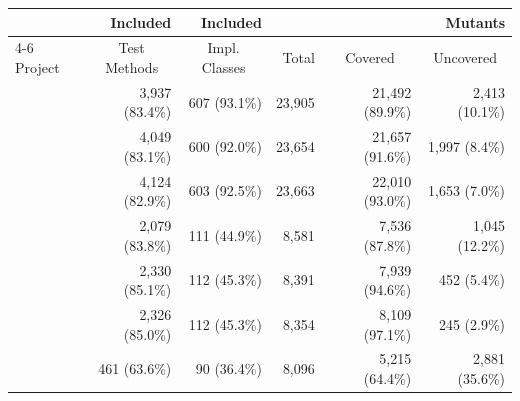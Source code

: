   \begin{tabular}{lrrrrr}
  \toprule
   & Included & Included  & \multicolumn{3}{r}{Mutants} \\
  \cmidrule(lr){4-6}
  Project & \multicolumn{1}{c}{Test Methods} & \multicolumn{1}{c}{Impl. Classes} & Total & \multicolumn{1}{c}{Covered} & \multicolumn{1}{c}{Uncovered} \\
  \midrule
  \DatasetEqBenchA{} & 3,937\; (83.4\%) & 607\; (93.1\%) & 23,905 & 21,492\; (89.9\%) & 2,413\; (10.1\%) \\
  \DatasetEqBenchB{} & 4,049\; (83.1\%) & 600\; (92.0\%) & 23,654 & 21,657\; (91.6\%) & 1,997\; (\phantom{0}8.4\%) \\
  \DatasetEqBenchC{} & 4,124\; (82.9\%) & 603\; (92.5\%) & 23,663 & 22,010\; (93.0\%) & 1,653\; (\phantom{0}7.0\%) \\
  \midrule
  \DatasetCommonsA{} & 2,079\; (83.8\%) & 111\; (44.9\%) & 8,581 & 7,536\; (87.8\%) & 1,045\; (12.2\%) \\
  \DatasetCommonsB{} & 2,330\; (85.1\%) & 112\; (45.3\%) & 8,391 & 7,939\; (94.6\%) & 452\; (\phantom{0}5.4\%) \\
  \DatasetCommonsC{} & 2,326\; (85.0\%) & 112\; (45.3\%) & 8,354 & 8,109\; (97.1\%) & 245\; (\phantom{0}2.9\%) \\
  \midrule
  \DatasetCommonsDev{} & 461\; (63.6\%) & 90\; (36.4\%) & 8,096 & 5,215\; (64.4\%) & 2,881\; (35.6\%) \\
  \bottomrule
  \end{tabular}
